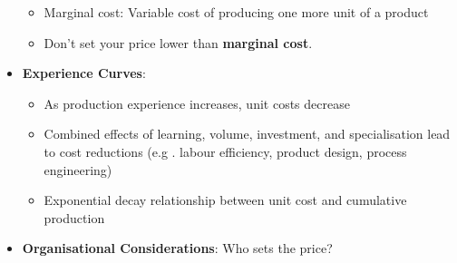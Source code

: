 \documentclass[10pt, landscape]{article}
\begin{document}
\begin{multicols*}{4}
\begin{itemize}
\begin{itemize}
      \item Marginal cost: Variable cost of producing one more unit of a product
      \item Don't set your price lower than \textbf{marginal cost}.
    \end{itemize}
    \item \textbf{Experience Curves}:
    \begin{itemize}
      \item As production experience increases, unit costs decrease
      \item Combined effects of learning, volume, investment, and specialisation lead to cost reductions (e.g . labour efficiency, product design, process engineering)
      \item Exponential decay relationship between unit cost and cumulative production
    \end{itemize}
    \item \textbf{Organisational Considerations}: Who sets the price?
  \end{itemize}


\end{multicols*}
\end{document}
